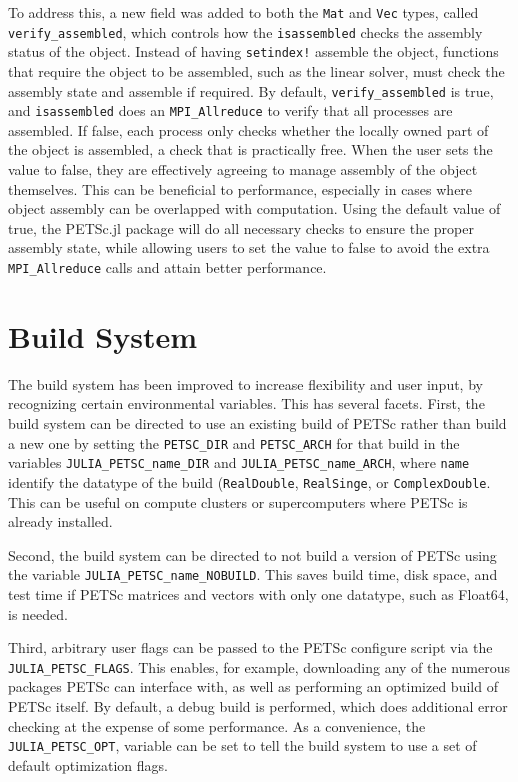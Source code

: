 \documentclass{article}
\begin{document}
To address this, a new field was added 
to both the \texttt{Mat} and \texttt{Vec} types, called 
\texttt{verify\_assembled}, which controls how the \texttt{isassembled} checks
the assembly status of the object.  Instead of having \texttt{setindex!}
assemble the object, functions that require the object to be assembled, such
as the linear solver, must 
check the assembly state and assemble if required.  
By default, \texttt{verify\_assembled} is true, and \texttt{isassembled} does
an \texttt{MPI\_Allreduce} to verify that all processes are assembled.  If
false, each process only checks whether the locally owned part of the object
is assembled, a check that is practically free.  When the user sets the 
value to false, they are effectively agreeing to manage assembly of the 
object themselves.  This can be beneficial to performance, especially in cases
where object assembly can be overlapped with computation.  Using the default 
value of true, the PETSc.jl package will do all necessary checks to ensure
the proper assembly state, while allowing users to set the value to false to 
avoid the extra \texttt{MPI\_Allreduce} calls and attain better performance.

\section{Build System}
The build system has been improved to increase flexibility and user input, by
recognizing certain environmental variables.  This has several facets.  
First, the build system can be directed to use an existing build of PETSc 
rather than build a new one by setting the \texttt{PETSC\_DIR} and 
\texttt{PETSC\_ARCH} for that build in the variables 
\texttt{JULIA\_PETSC\_name\_DIR} and \texttt{JULIA\_PETSC\_name\_ARCH}, where \texttt{name} identify the datatype of the build (\texttt{RealDouble}, 
\texttt{RealSinge}, or \texttt{ComplexDouble}.  This can be useful on compute
clusters or supercomputers where PETSc is already installed.  

Second, the build system can be directed to not build a version of PETSc using
the variable \texttt{JULIA\_PETSC\_name\_NOBUILD}.  This saves build time, 
disk space, and test time if PETSc matrices and vectors with only one datatype,
 such as Float64, is needed.

Third, arbitrary user flags can be passed to the PETSc configure script via
the \texttt{JULIA\_PETSC\_FLAGS}.  This enables, for example, downloading 
any of the numerous packages PETSc can interface with, as well as performing 
an optimized build of PETSc itself.  By default, a debug build is performed, 
which does additional error checking at the expense of some performance.  
As a convenience, the \texttt{JULIA\_PETSC\_OPT}, variable can be set to tell
the build system to use a set of default optimization flags.
\end{document}
